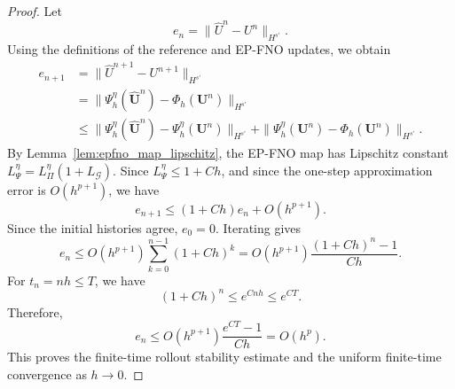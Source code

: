 \documentclass[11pt,a4paper]{article}
\newtheorem{theorem}{Theorem}[section]
\theoremstyle{definition}
\theoremstyle{remark}
\numberwithin{equation}{section}
\numberwithin{figure}{section}
\numberwithin{table}{section}
\begin{document}
\begin{proof}
Let
\[
    e_n=\|\widehat U^n-U^n\|_{H^{s'}} .
\]
Using the definitions of the reference and EP-FNO updates, we obtain
\[
\begin{aligned}
    e_{n+1}
    &=
    \|\widehat U^{n+1}-U^{n+1}\|_{H^{s'}} \\
    &=
    \|\Psi_h^\eta(\widehat{\mathbf U}^n)-\Phi_h(\mathbf U^n)\|_{H^{s'}} \\
    &\le
    \|\Psi_h^\eta(\widehat{\mathbf U}^n)
    -
    \Psi_h^\eta(\mathbf U^n)\|_{H^{s'}}
    +
    \|\Psi_h^\eta(\mathbf U^n)-\Phi_h(\mathbf U^n)\|_{H^{s'}} .
\end{aligned}
\]
By Lemma~\ref{lem:epfno_map_lipschitz}, the EP-FNO map has Lipschitz constant
$L_\Psi^\eta=L_\Pi^\eta(1+L_{\mathcal G})$. Since
$L_\Psi^\eta\le 1+Ch$, and since the one-step approximation error is
\(O(h^{p+1})\), we have
\[
    e_{n+1}
    \le
    (1+Ch)e_n+O(h^{p+1}) .
\]
Since the initial histories agree, \(e_0=0\). Iterating gives
\[
    e_n
    \le
    O(h^{p+1})\sum_{k=0}^{n-1}(1+Ch)^k
    =
    O(h^{p+1})
    \frac{(1+Ch)^n-1}{Ch}.
\]
For \(t_n=nh\le T\), we have
\[
    (1+Ch)^n\le e^{Cnh}\le e^{CT}.
\]
Therefore,
\[
    e_n
    \le
    O(h^{p+1})
    \frac{e^{CT}-1}{Ch}
    =
    O(h^p).
\]
This proves the finite-time rollout stability estimate and the uniform
finite-time convergence as \(h\to 0\).
\end{proof}



\end{document}
